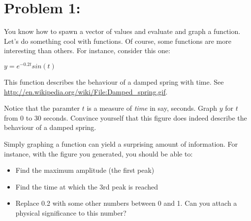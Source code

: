 \documentclass{article}
\begin{document}
\section*{Problem 1: }

You know how to spawn a vector of values and evaluate and graph a 
function. Let's do something cool with functions. Of course, some functions 
are more interesting than others. For instance, consider this one:

\begin{center}
$y = e^{-0.2t}sin(t)$
\end{center}

This function describes the behaviour of a damped spring with time.
See \url{http://en.wikipedia.org/wiki/File:Damped_spring.gif}. 

Notice that the paramter $t$ is a measure of \emph{time} in say, seconds. 
Graph $y$ for $t$ from 0 to 30 seconds. Convince yourself that this figure 
does indeed describe the behaviour of a damped spring.

Simply graphing a function can yield a surprising amount of information.
For instance, with the figure you generated, you should be able to:

\begin{itemize}
\item{Find the maximum amplitude (the first peak)}
\item{Find the time at which the 3rd peak is reached}
\item{Replace 0.2 with some other numbers
    between 0 and 1. Can you attach a physical significance
    to this number?}
\end{itemize}
\end{document}
